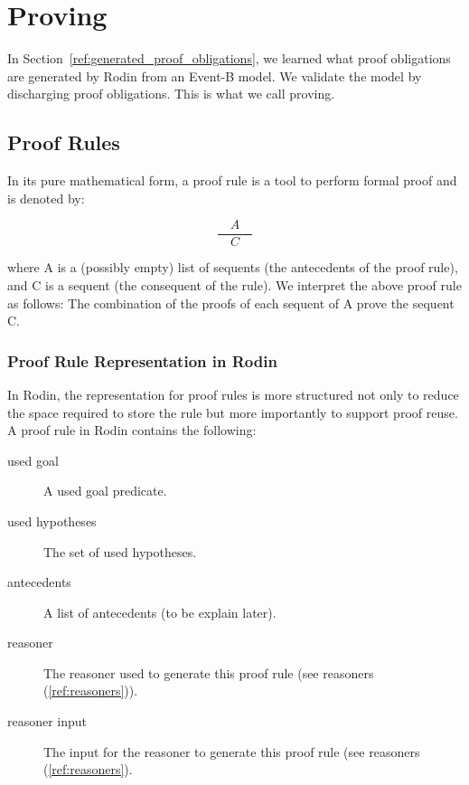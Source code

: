 \section{Proving}
\label{reference_04}

In Section~\ref{ref:generated_proof_obligations}, we learned what proof obligations are generated by Rodin from an Event-B model.  We validate the model by discharging proof obligations.  This is what we call proving.


\subsection{Proof Rules}

In its pure mathematical form, a proof rule is a tool to perform formal proof and is denoted by: 

$$\frac{\quad A\quad}{C}$$

where A is a (possibly empty) list of sequents (the antecedents of the proof rule), and C is a sequent (the consequent of the rule). We interpret the above proof rule as follows: The combination of the proofs of each sequent of A prove the sequent C. 


\subsubsection{Proof Rule Representation in Rodin}

In Rodin, the representation for proof rules is more structured not only to reduce the space required to store the rule but more importantly to support proof reuse.
A proof rule in Rodin contains the following:

\begin{description}
	\item[used goal] A used goal predicate. 
	\item[used hypotheses] The set of used hypotheses. 
	\item[antecedents] A list of antecedents (to be explain later). 
	\item[reasoner] The reasoner used to generate this proof rule (see reasoners (\ref{ref:reasoners})). 
	\item[reasoner input] The input for the reasoner to generate this proof rule (see reasoners (\ref{ref:reasoners}). 
\end{description}

